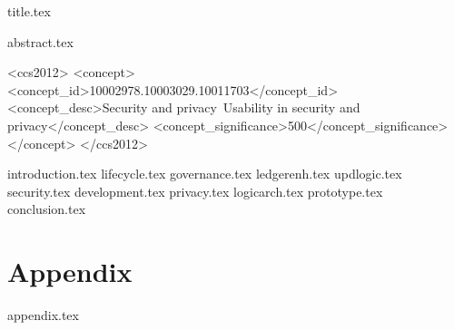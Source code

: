 \documentclass[sigconf, anonymous]{acmart}
\begin{document}
{title.tex}


{abstract.tex}



\begin{CCSXML}
<ccs2012>
<concept>
<concept_id>10002978.10003029.10011703</concept_id>
<concept_desc>Security and privacy~Usability in security and privacy</concept_desc>
<concept_significance>500</concept_significance>
</concept>
</ccs2012>
\end{CCSXML}





{introduction.tex}
{lifecycle.tex}
{governance.tex}
{ledgerenh.tex}
{updlogic.tex}
{security.tex}
{development.tex}
{privacy.tex}
{logicarch.tex}
{prototype.tex}
{conclusion.tex}


\ifshort\else
\appendix
\section*{Appendix}
{appendix.tex}
\fi



\end{document}
